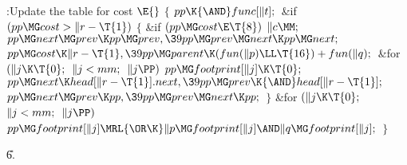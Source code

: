 \Y\B\4:Update the table for cost \X${}\E{}$\6
${}\{{}$\1\6
${}\\{pp}\K{\AND}\\{func}[\|t];{}$\6
\&{if} ${}(\\{pp}\MG\\{cost}>\|r-\T{1}){}$\5
${}\{{}$\1\6
\&{if} ${}(\\{pp}\MG\\{cost}\E\T{8}){}$\1\5
${}\|c\MM;{}$\2\6
${}\\{pp}\MG\\{next}\MG\\{prev}\K\\{pp}\MG\\{prev},\39\\{pp}\MG\\{prev}\MG%
\\{next}\K\\{pp}\MG\\{next};{}$\6
${}\\{pp}\MG\\{cost}\K\|r-\T{1},\39\\{pp}\MG\\{parent}\K(\\{fun}(\|p)\LL%
\T{16})+\\{fun}(\|q);{}$\6
\&{for} ${}(\|j\K\T{0};{}$ ${}\|j<\\{mm};{}$ ${}\|j\PP){}$\1\5
${}\\{pp}\MG\\{footprint}[\|j]\K\T{0};{}$\2\6
${}\\{pp}\MG\\{next}\K\\{head}[\|r-\T{1}].\\{next},\39\\{pp}\MG\\{prev}\K{\AND}%
\\{head}[\|r-\T{1}];{}$\6
${}\\{pp}\MG\\{next}\MG\\{prev}\K\\{pp},\39\\{pp}\MG\\{prev}\MG\\{next}\K%
\\{pp};{}$\6
\4${}\}{}$\2\6
\&{for} ${}(\|j\K\T{0};{}$ ${}\|j<\\{mm};{}$ ${}\|j\PP){}$\1\5
${}\\{pp}\MG\\{footprint}[\|j]\MRL{{\OR}{\K}}\|p\MG\\{footprint}[\|j]\AND\|q\MG%
\\{footprint}[\|j];{}$\2\6
\4${}\}{}$\2\par
\U6.\fi

